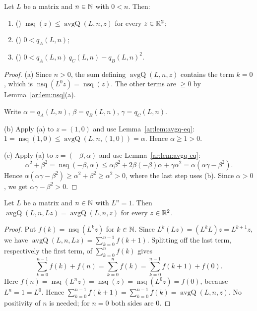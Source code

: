 \begin{lemma}\label{ar:lem:avgq-pos}
Let $L$ be a matrix and $n\in\mathbb N$ with $0<n$. Then:
\begin{enumerate}[label=\textup{(\alph*)}]
\item \textup{(}\textup{)} $\operatorname{nsq}(z)\le\operatorname{avgQ}(L,n,z)$ for every $z\in\mathbb R^2$;
\item \textup{(}\textup{)} $0<q_A(L,n)$;
\item \textup{(}\textup{)} $0<q_A(L,n)\,q_C(L,n)-q_B(L,n)^2$.
\end{enumerate}
\end{lemma}

\begin{proof}
(a) Since $n>0$, the sum defining $\operatorname{avgQ}(L,n,z)$ contains the term $k=0$, which is
$\operatorname{nsq}(L^0z)=\operatorname{nsq}(z)$. The other terms are $\ge0$ by Lemma~\ref{ar:lem:nsq}(a).

Write $\alpha=q_A(L,n)$, $\beta=q_B(L,n)$, $\gamma=q_C(L,n)$.

(b) Apply (a) to $z=(1,0)$ and use Lemma~\ref{ar:lem:avgq-eq}: $1=\operatorname{nsq}(1,0)\le\operatorname{avgQ}(L,n,(1,0))
=\alpha$. Hence $\alpha\ge1>0$.

(c) Apply (a) to $z=(-\beta,\alpha)$ and use Lemma~\ref{ar:lem:avgq-eq}:
\[
\alpha^2+\beta^2=\operatorname{nsq}(-\beta,\alpha)\le\alpha\beta^2+2\beta(-\beta)\alpha+\gamma\alpha^2
=\alpha(\alpha\gamma-\beta^2).
\]
Hence $\alpha(\alpha\gamma-\beta^2)\ge\alpha^2+\beta^2\ge\alpha^2>0$, where the last step uses (b). Since $\alpha>0$, we
get $\alpha\gamma-\beta^2>0$.
\end{proof}

\begin{lemma}\label{ar:lem:avgq-inv}
Let $L$ be a matrix and $n\in\mathbb N$ with $L^n=1$. Then $\operatorname{avgQ}(L,n,Lz)=\operatorname{avgQ}(L,n,z)$ for every
$z\in\mathbb R^2$.
\end{lemma}

\begin{proof}
Put $f(k)=\operatorname{nsq}(L^kz)$ for $k\in\mathbb N$. Since $L^k(Lz)=(L^kL)z=L^{k+1}z$, we have
$\operatorname{avgQ}(L,n,Lz)=\sum_{k=0}^{n-1}f(k+1)$. Splitting off the last term, respectively the first term, of
$\sum_{k=0}^{n}f(k)$ gives
\[
\sum_{k=0}^{n-1}f(k)+f(n)=\sum_{k=0}^{n}f(k)=\sum_{k=0}^{n-1}f(k+1)+f(0).
\]
Here $f(n)=\operatorname{nsq}(L^nz)=\operatorname{nsq}(z)=\operatorname{nsq}(L^0z)=f(0)$, because $L^n=1=L^0$. Hence
$\sum_{k=0}^{n-1}f(k+1)=\sum_{k=0}^{n-1}f(k)=\operatorname{avgQ}(L,n,z)$. No positivity of $n$ is needed; for $n=0$
both sides are $0$.
\end{proof}

